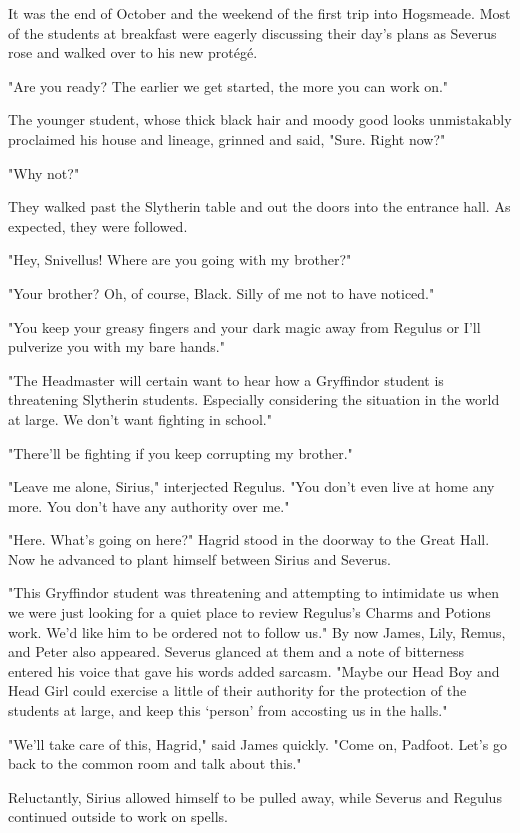It was the end of October and the weekend of the first trip into Hogsmeade. Most of the students at breakfast were eagerly discussing their day's plans as Severus rose and walked over to his new protégé.

"Are you ready? The earlier we get started, the more you can work on."

The younger student, whose thick black hair and moody good looks unmistakably proclaimed his house and lineage, grinned and said, "Sure. Right now?"

"Why not?"

They walked past the Slytherin table and out the doors into the entrance hall. As expected, they were followed.

"Hey, Snivellus! Where are you going with my brother?"

"Your brother? Oh, of course, Black. Silly of me not to have noticed."

"You keep your greasy fingers and your dark magic away from Regulus or I'll pulverize you with my bare hands."

"The Headmaster will certain want to hear how a Gryffindor student is threatening Slytherin students. Especially considering the situation in the world at large. We don't want fighting in school."

"There'll be fighting if you keep corrupting my brother."

"Leave me alone, Sirius," interjected Regulus. "You don't even live at home any more. You don't have any authority over me."

"Here. What's going on here?" Hagrid stood in the doorway to the Great Hall. Now he advanced to plant himself between Sirius and Severus.

"This Gryffindor student was threatening and attempting to intimidate us when we were just looking for a quiet place to review Regulus's Charms and Potions work. We'd like him to be ordered not to follow us." By now James, Lily, Remus, and Peter also appeared. Severus glanced at them and a note of bitterness entered his voice that gave his words added sarcasm. "Maybe our Head Boy and Head Girl could exercise a little of their authority for the protection of the students at large, and keep this `person' from accosting us in the halls."

"We'll take care of this, Hagrid," said James quickly. "Come on, Padfoot. Let's go back to the common room and talk about this."

Reluctantly, Sirius allowed himself to be pulled away, while Severus and Regulus continued outside to work on spells.

